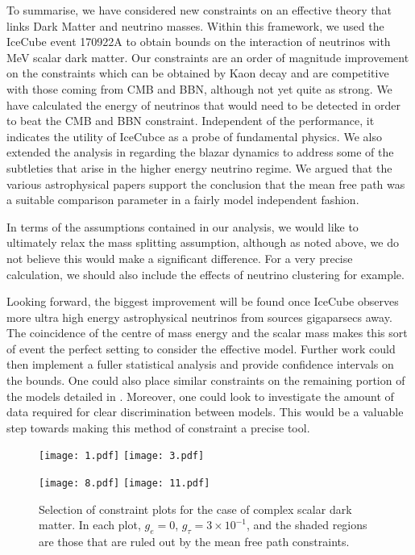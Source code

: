 To summarise, we have considered new constraints on an effective theory that links Dark Matter and neutrino masses. Within this framework, we used the IceCube event 170922A to obtain bounds on the interaction of neutrinos with MeV scalar dark matter. Our constraints are an order of magnitude improvement on the constraints which can be obtained by Kaon decay and are competitive with those coming from CMB and BBN, although not yet quite as strong.  We have calculated the energy of neutrinos that would need to be detected in order to beat the CMB and BBN constraint. Independent of the performance, it indicates the utility of IceCubce as a probe of fundamental physics. We also extended the analysis in \cite{Kelly} regarding the blazar dynamics to address some of the subtleties that arise in the higher energy neutrino regime. We argued that the various astrophysical papers \cite{Padovani2018, Padovani2019, Keivani2018} support the conclusion that the mean free path was a suitable comparison parameter in a fairly model independent fashion.

In terms of the assumptions contained in our analysis, we would like to ultimately relax the mass splitting assumption, although as noted above, we do not believe this would make a significant difference. For a very precise calculation, we should also include the effects of neutrino clustering for example.

Looking forward, the biggest improvement will be found once IceCube observes more ultra high energy astrophysical neutrinos from sources gigaparsecs away. The coincidence of the centre of mass energy and the scalar mass makes this sort of event the perfect setting to consider the effective model. Further work could then implement a fuller statistical analysis and provide confidence intervals on the bounds. One could also place similar constraints on the remaining portion of the models detailed in \cite{BoehmPascoli}. Moreover, one could look to investigate the amount of data required for clear discrimination between models. This would be a valuable step towards making this method of constraint a precise tool.


\clearpage

\begin{figure}[t]
 \centering
 \texttt{[image: 1.pdf]}\quad
 \texttt{[image: 3.pdf]}

 \medskip

 \texttt{[image: 8.pdf]}\quad
 \texttt{[image: 11.pdf]}
 \caption{Selection of constraint plots for the case of complex scalar dark matter. In each plot, $g_e = 0$, $g_\tau = 3 \times 10^{-1}$, and the shaded regions are those that are ruled out by the mean free path constraints.}
 \label{fig:main}
\end{figure}
\clearpage